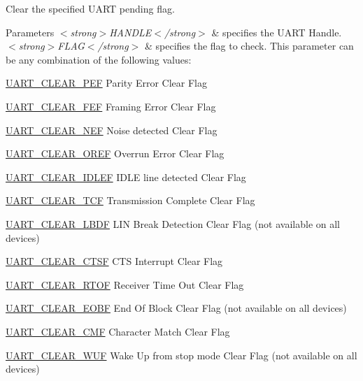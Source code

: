 Clear the specified U\+A\+RT pending flag. 


\begin{DoxyParams}{Parameters}
{\em $<$strong$>$\+H\+A\+N\+D\+L\+E$<$/strong$>$} & specifies the U\+A\+RT Handle. \\
\hline
{\em $<$strong$>$\+F\+L\+A\+G$<$/strong$>$} & specifies the flag to check. This parameter can be any combination of the following values\+: \begin{DoxyItemize}
\item \hyperlink{group___u_a_r_t___i_t___c_l_e_a_r___flags_ga9c2aef8048dd09ea5e72d69c63026f02}{U\+A\+R\+T\+\_\+\+C\+L\+E\+A\+R\+\_\+\+P\+EF} Parity Error Clear Flag \item \hyperlink{group___u_a_r_t___i_t___c_l_e_a_r___flags_ga2040edf7a1daa2e9f352364e285ef5c3}{U\+A\+R\+T\+\_\+\+C\+L\+E\+A\+R\+\_\+\+F\+EF} Framing Error Clear Flag \item \hyperlink{group___u_a_r_t___i_t___c_l_e_a_r___flags_gad5b9aafb495296d917a5d85e63383396}{U\+A\+R\+T\+\_\+\+C\+L\+E\+A\+R\+\_\+\+N\+EF} Noise detected Clear Flag \item \hyperlink{group___u_a_r_t___i_t___c_l_e_a_r___flags_ga3bc97b70293f9a7bf8cc21a74094afad}{U\+A\+R\+T\+\_\+\+C\+L\+E\+A\+R\+\_\+\+O\+R\+EF} Overrun Error Clear Flag \item \hyperlink{group___u_a_r_t___i_t___c_l_e_a_r___flags_ga75ee9be0ac2236931ef3d9514e7dedf4}{U\+A\+R\+T\+\_\+\+C\+L\+E\+A\+R\+\_\+\+I\+D\+L\+EF} I\+D\+LE line detected Clear Flag \item \hyperlink{group___u_a_r_t___i_t___c_l_e_a_r___flags_gadfbfe4df408d1d09ff2adc1ddad3de09}{U\+A\+R\+T\+\_\+\+C\+L\+E\+A\+R\+\_\+\+T\+CF} Transmission Complete Clear Flag \item \hyperlink{group___u_a_r_t___i_t___c_l_e_a_r___flags_ga030414d9a93ad994156210644634b73c}{U\+A\+R\+T\+\_\+\+C\+L\+E\+A\+R\+\_\+\+L\+B\+DF} L\+IN Break Detection Clear Flag (not available on all devices) \item \hyperlink{group___u_a_r_t___i_t___c_l_e_a_r___flags_gabe0f3bc774ad0b9319732da3be8374cf}{U\+A\+R\+T\+\_\+\+C\+L\+E\+A\+R\+\_\+\+C\+T\+SF} C\+TS Interrupt Clear Flag \item \hyperlink{group___u_a_r_t___i_t___c_l_e_a_r___flags_ga2735a415d2c7930fdf2818943fd7ddd2}{U\+A\+R\+T\+\_\+\+C\+L\+E\+A\+R\+\_\+\+R\+T\+OF} Receiver Time Out Clear Flag \item \hyperlink{group___u_a_r_t___i_t___c_l_e_a_r___flags_gaa603f7ce051b012045da4d7e665d6ac6}{U\+A\+R\+T\+\_\+\+C\+L\+E\+A\+R\+\_\+\+E\+O\+BF} End Of Block Clear Flag (not available on all devices) \item \hyperlink{group___u_a_r_t___i_t___c_l_e_a_r___flags_ga5815698abf54d69b752bd2c43c2d6ad3}{U\+A\+R\+T\+\_\+\+C\+L\+E\+A\+R\+\_\+\+C\+MF} Character Match Clear Flag \item \hyperlink{group___u_a_r_t___i_t___c_l_e_a_r___flags_ga5081c579f9956a7712248430f3fe129b}{U\+A\+R\+T\+\_\+\+C\+L\+E\+A\+R\+\_\+\+W\+UF} Wake Up from stop mode Clear Flag (not available on all devices) \end{DoxyItemize}
\\
\hline
\end{DoxyParams}

